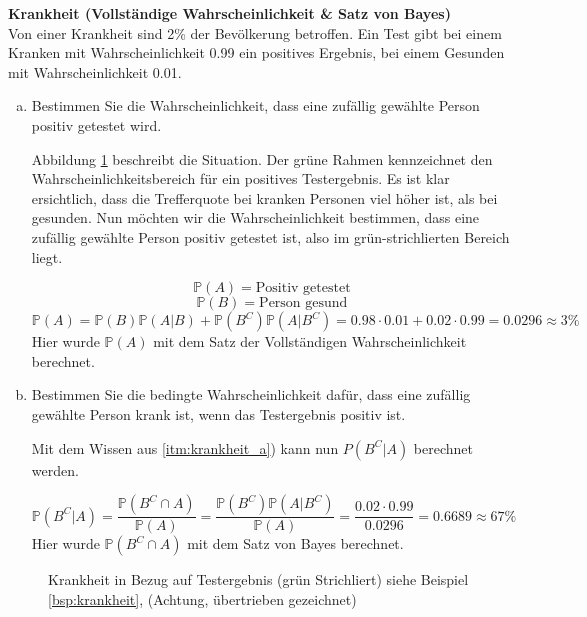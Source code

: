 {    \begin{bsp}\label{bsp:krankheit} \textbf{Krankheit (Vollständige Wahrscheinlichkeit \& Satz von Bayes)}\\

    Von einer Krankheit sind 2\% der Bevölkerung betroffen. Ein Test gibt
    bei einem Kranken mit Wahrscheinlichkeit 0.99 ein positives Ergebnis,
    bei einem Gesunden mit Wahrscheinlichkeit 0.01.

    \begin{enumerate}[a)]
        \item \label{itm:krankheit_a}Bestimmen Sie die Wahrscheinlichkeit, dass eine zufällig gewählte
            Person positiv getestet wird.

            Abbildung \ref{fig:krankheit} beschreibt die Situation. Der grüne Rahmen kennzeichnet den
            Wahrscheinlichkeitsbereich für ein positives Testergebnis. Es ist klar
            ersichtlich, dass die Trefferquote bei kranken Personen viel höher ist,
            als bei gesunden. Nun möchten wir die Wahrscheinlichkeit bestimmen,
            dass eine zufällig gewählte Person positiv getestet ist, also im
            grün-strichlierten Bereich liegt.

            \[\mathbb P\left(A\right)=\text{Positiv getestet}\]
            \[\mathbb P\left(B\right)=\text{Person gesund}\]
            \[\mathbb P\left(A\right)=\mathbb P\left(B\right)\mathbb P\left(A|B\right)+\mathbb P\left(B^{C}\right)\mathbb P\left(A|B^{C}\right) = 0.98\cdot 0.01+0.02\cdot 0.99=0.0296\approx 3\%\]
            Hier wurde $\mathbb P(A)$ mit dem Satz der Vollständigen Wahrscheinlichkeit berechnet. 
        \item Bestimmen Sie die bedingte Wahrscheinlichkeit dafür, dass eine
            zufällig gewählte Person krank ist, wenn das Testergebnis positiv ist.

            Mit dem Wissen aus \ref{itm:krankheit_a}) kann nun  $P(B^{C}|A)$ berechnet werden.

            \[
                \mathbb P(B^{C}|A)=\frac{\mathbb P(B^{C}\cap A)}{\mathbb P\left(A\right)}=
                \frac{\mathbb P\left(B^{C}\right)\mathbb P(A|B^{C})}{\mathbb P(A)}=\frac{0.02\cdot 0.99}{0.0296}=0.6689\approx 67\%
            \]
            Hier wurde $\mathbb P\left(B^{C}\cap A\right)$ mit dem Satz von Bayes berechnet.
        \end{enumerate}
    \end{bsp}

    \begin{figure}
    \centering
        \begin{tikzpicture}
            
        \end{tikzpicture}
        \caption{Krankheit in Bezug auf Testergebnis (grün Strichliert) siehe Beispiel \ref{bsp:krankheit}, (Achtung, übertrieben gezeichnet)}
        \label{fig:krankheit}
    \end{figure}


    \ifdefined\uebsps
    
    \fi
}
